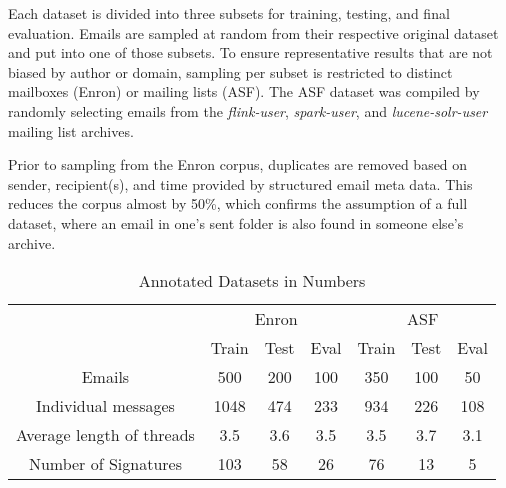 \documentclass{llncs}
\begin{document}
Each dataset is divided into three subsets for training, testing, and final evaluation.
Emails are sampled at random from their respective original dataset and put into one of those subsets.
To ensure representative results that are not biased by author or domain, sampling per subset is restricted to distinct mailboxes (Enron) or mailing lists (ASF).
The ASF dataset was compiled by randomly selecting emails from the \textit{flink-user}, \textit{spark-user}, and \textit{lucene-solr-user} mailing list archives.

Prior to sampling from the Enron corpus, duplicates are removed based on sender, recipient(s), and time provided by structured email meta data.
This reduces the corpus almost by 50\%, which confirms the assumption of a full dataset, where an email in one's sent folder is also found in someone else's archive.

\begin{table}
	\caption{Annotated Datasets in Numbers}
	\label{tab:dataset}
	\centering
	\begin{tabular*}{\textwidth}{@{\extracolsep{\fill}} ccccccc}
		\toprule
		& \multicolumn{3}{c}{Enron} &  \multicolumn{3}{c}{ASF} \\
		\cmidrule{2-4}
		\cmidrule{5-7}
		                          & Train    & Test   & Eval   & Train   & Test   & Eval  \\
		\midrule
		Emails                    & 500      & 200    & 100    &  350   &  100   &   50   \\
		Individual messages       & 1048     & 474    & 233    &  934   &  226   &   108  \\
		Average length of threads & 3.5      & 3.6    & 3.5    &  3.5   &  3.7   &   3.1  \\
		Number of Signatures      & 103      & 58     & 26     &  76    &  13    &   5    \\
		\bottomrule
	\end{tabular*}
\end{table}
\end{document}
